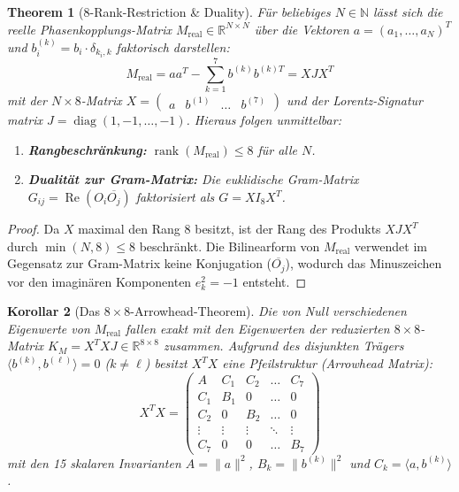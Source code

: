 \documentclass[11pt,a4paper]{article}
\newtheorem{theorem}{Theorem}[section]
\newtheorem{korollar}[theorem]{Korollar}
\theoremstyle{remark}
\begin{document}
	\begin{theorem}[8-Rank-Restriction \& Duality]
		\label{thm:spectral_reduction}
		Für beliebiges $N \in \mathbb{N}$ lässt sich die reelle Phasenkopplungs-Matrix $M_{\mathrm{real}} \in \mathbb{R}^{N \times N}$ über die Vektoren $a = (a_1,\dots,a_N)^T$ und $b^{(k)}_i = b_i \cdot \delta_{k_i, k}$ faktorisch darstellen:
		\begin{equation}
			M_{\mathrm{real}} = a a^T - \sum_{k=1}^7 b^{(k)} b^{(k)T} = X J X^T
		\end{equation}
		mit der $N \times 8$-Matrix $X = \begin{pmatrix} a & b^{(1)} & \dots & b^{(7)} \end{pmatrix}$ und der Lorentz-Signatur matrix $J = \operatorname{diag}(1, -1, \dots, -1)$. Hieraus folgen unmittelbar:
		\begin{enumerate}
			\item \textbf{Rangbeschränkung:} $\operatorname{rank}(M_{\mathrm{real}}) \le 8$ für alle $N$.
			\item \textbf{Dualität zur Gram-Matrix:} Die euklidische Gram-Matrix $G_{ij} = \operatorname{Re}(O_i \overline{O_j})$ faktorisiert als $G = X I_8 X^T$.
		\end{enumerate}
	\end{theorem}
	
	\begin{proof}
		Da $X$ maximal den Rang $8$ besitzt, ist der Rang des Produkts $X J X^T$ durch $\min(N, 8) \le 8$ beschränkt. Die Bilinearform von $M_{\mathrm{real}}$ verwendet im Gegensatz zur Gram-Matrix keine Konjugation ($\overline{O_j}$), wodurch das Minuszeichen vor den imaginären Komponenten $e_k^2 = -1$ entsteht.
	\end{proof}
	
	\begin{korollar}[Das $8 \times 8$-Arrowhead-Theorem]
		Die von Null verschiedenen Eigenwerte von $M_{\mathrm{real}}$ fallen exakt mit den Eigenwerten der reduzierten $8 \times 8$-Matrix $K_M = X^T X J \in \mathbb{R}^{8 \times 8}$ zusammen. Aufgrund des disjunkten Trägers $\langle b^{(k)}, b^{(\ell)} \rangle = 0$ ($k \neq \ell$) besitzt $X^T X$ eine Pfeilstruktur (\emph{Arrowhead Matrix}):
		\begin{equation}
			X^T X = \begin{pmatrix} 
				A & C_1 & C_2 & \dots & C_7 \\ 
				C_1 & B_1 & 0 & \dots & 0 \\ 
				C_2 & 0 & B_2 & \dots & 0 \\ 
				\vdots & \vdots & \vdots & \ddots & \vdots \\ 
				C_7 & 0 & 0 & \dots & B_7 
			\end{pmatrix}
		\end{equation}
		mit den 15 skalaren Invarianten $A = \|a\|^2$, $B_k = \|b^{(k)}\|^2$ und $C_k = \langle a, b^{(k)} \rangle$.
	\end{korollar}
	
\end{document}
